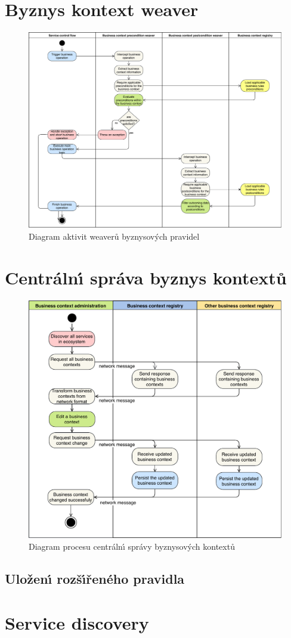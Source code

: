 \section{Byznys kontext weaver}

\begin{figure}
    \centering
    \includegraphics[keepaspectratio=true, width=0.8\linewidth]{figures/business-rules-weaver.pdf}
    \caption{Diagram aktivit weaverů byznysov\'ych pravidel}
    \label{fig:business-rules-weaver}
\end{figure} %

\section{Centráln\'{\i} správa byznys kontextů}

\begin{figure}
    \centering
    \includegraphics[keepaspectratio=true, width=0.8\linewidth]{figures/business-context-management.pdf}
    \caption{Diagram procesu centráln\'{\i} správy byznysov\'ych kontextů}
    \label{fig:business-context-management}
\end{figure} %

\subsection{Uložen\'{\i} rozš\'{\i}řeného pravidla}


\section{Service discovery}


